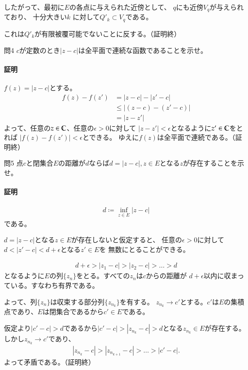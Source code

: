 したがって、最初に$E$の各点に与えられた近傍として、
$q$にも近傍$V_q$が与えられており、
十分大きい$k$ に対して$Q'_k\subset V_q$である。

これは$Q'_k$が有限被覆可能でないことに反する。（証明終）

\begin{mysimplebox}{問4}
    $c$が定数のとき$|z-c|$は全平面で連続な函数であることを示せ。
\end{mysimplebox}
\paragraph{証明}
$f(z)=|z-c|$とする。
\begin{align*}
    f(z)-f(z')&=|z-c|-|z'-c|\\
    &\le |(z-c)-(z'-c)|\\
    &=|z-z'|
\end{align*}
よって、任意の$z\in\mathbb{C}$、任意の$\epsilon>0$に対して
$|z-z'|<\epsilon$となるように$z'\in\mathbb{C}$をとれば
$|f(z)-f(z')|<\epsilon$とできる。
ゆえに$f(z)$は全平面で連続である。（証明終）

\begin{mysimplebox}{問5}
    点$c$と閉集合$E$の距離が$d$ならば$d=|z-c|, z\in E$となる$z$が存在することを示せ。
\end{mysimplebox}
\paragraph{証明}
\begin{align*}
    d\coloneqq \inf_{z\in E}|z-c|
\end{align*}
である。

$d=|z-c|$となる$z\in E$が存在しないと仮定すると、
任意の$\epsilon>0$に対して$d<|z'-c|<d+\epsilon$となる$z'\in E$を
無数にとることができる。

\begin{align*}
    d+\epsilon>|z_1-c|>|z_2-c|>\dots>d
\end{align*}
となるように$E$の列$\{z_n\}$をとる。すべての$z_n$は$c$からの距離が
$d+\epsilon$以内に収まっている。すなわち有界である。

よって、列$\{z_n\}$は収束する部分列$\{z_{n_k}\}$を有する。
$z_{n_k}\longrightarrow c'$とする。$c'$は$E$の集積点であり、$E$は閉集合であるから$c'\in E$である。

仮定より$|c'-c|>d$であるから$|c'-c|>|z_{n_k}-c|>d$となる$z_{n_k}\in E$が存在する。しかし$z_{n_k}\longrightarrow c'$であり、
\begin{align*}
    |z_{n_k}-c|>|z_{n_{k+1}}-c|>\dots>|c'-c|.
\end{align*}
よって矛盾である。（証明終）

